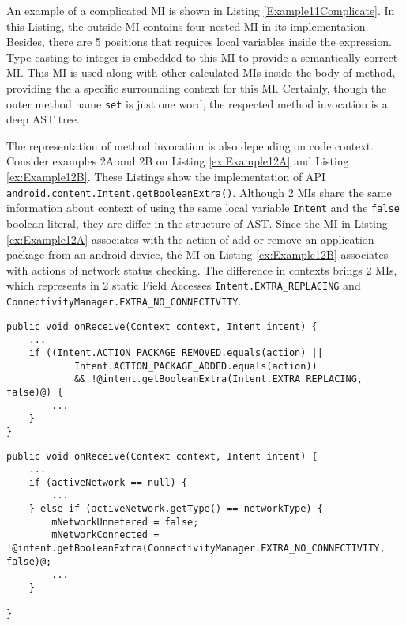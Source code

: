 An example of a complicated MI is shown in Listing \ref{Example11Complicate}. In this Listing, the outside MI contains four nested MI in its implementation. Besides, there are 5 positions that requires local variables inside the expression. Type casting to integer is embedded to this MI to provide a semantically correct MI. This MI is used along with other calculated MIs inside the body of method, providing the a specific surrounding context for this MI. Certainly, though the outer method name \texttt{set} is just one word, the respected method invocation is a deep AST tree.

The representation of method invocation is also depending on code context. Consider examples 2A and 2B on Listing  \ref{ex:Example12A} and Listing \ref{ex:Example12B}. These Listings show the implementation of API \texttt{android.content.Intent.getBooleanExtra()}. Although 2 MIs share the same information about context of using the same local variable \texttt{Intent} and the \texttt{false} boolean literal, they are differ in the structure of AST. Since the MI in Listing \ref{ex:Example12A} associates with the action of add or remove an application package from an android device, the MI on Listing \ref{ex:Example12B} associates with actions of network status checking. The difference in contexts brings 2 MIs, which represents in 2 static Field Accesses \texttt{Intent.EXTRA\_REPLACING} and \texttt{ConnectivityManager.EXTRA\_NO\_CONNECTIVITY}.   

\begin{lstlisting}[basicstyle=\tiny,caption={Example 2A of invocation of API \texttt{android.content.Intent.getBooleanExtra()} in \cite{id:Example12A}},label={ex:Example12A},]
 public void onReceive(Context context, Intent intent) {
    ...
    if ((Intent.ACTION_PACKAGE_REMOVED.equals(action) ||
            Intent.ACTION_PACKAGE_ADDED.equals(action))
            && !@intent.getBooleanExtra(Intent.EXTRA_REPLACING, false)@) {
        ...
    }
}
\end{lstlisting}




\begin{lstlisting}[basicstyle=\tiny,caption={Example 2B of invocation of API \texttt{android.content.Intent.getBooleanExtra()} in \cite{id:Example12B}},label={ex:Example12B}]
public void onReceive(Context context, Intent intent) {
    ...
    if (activeNetwork == null) {
        ...
    } else if (activeNetwork.getType() == networkType) {
        mNetworkUnmetered = false;
        mNetworkConnected = !@intent.getBooleanExtra(ConnectivityManager.EXTRA_NO_CONNECTIVITY, false)@;
        ...
    }
    
}
\end{lstlisting}

